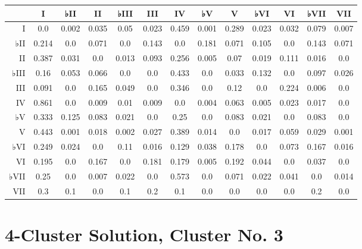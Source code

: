 \begin{table}[htbp]
\begin{minipage}{\linewidth}
\setlength{\tymax}{0.5\linewidth}
\centering
\small
\begin{tabulary}{\textwidth}{@{}RCCCCCCCCCCCC@{}} \toprule
&I&♭II&II&♭III&III&IV&♭V&V&♭VI&VI&♭VII&VII\\
\midrule
I&0.0&0.002&0.035&0.05&0.023&0.459&0.001&0.289&0.023&0.032&0.079&0.007\\
♭II&0.214&0.0&0.071&0.0&0.143&0.0&0.181&0.071&0.105&0.0&0.143&0.071\\
II&0.387&0.031&0.0&0.013&0.093&0.256&0.005&0.07&0.019&0.111&0.016&0.0\\
♭III&0.16&0.053&0.066&0.0&0.0&0.433&0.0&0.033&0.132&0.0&0.097&0.026\\
III&0.091&0.0&0.165&0.049&0.0&0.346&0.0&0.12&0.0&0.224&0.006&0.0\\
IV&0.861&0.0&0.009&0.01&0.009&0.0&0.004&0.063&0.005&0.023&0.017&0.0\\
♭V&0.333&0.125&0.083&0.021&0.0&0.25&0.0&0.083&0.021&0.0&0.083&0.0\\
V&0.443&0.001&0.018&0.002&0.027&0.389&0.014&0.0&0.017&0.059&0.029&0.001\\
♭VI&0.249&0.024&0.0&0.11&0.016&0.129&0.038&0.178&0.0&0.073&0.167&0.016\\
VI&0.195&0.0&0.167&0.0&0.181&0.179&0.005&0.192&0.044&0.0&0.037&0.0\\
♭VII&0.25&0.0&0.007&0.022&0.0&0.573&0.0&0.071&0.022&0.041&0.0&0.014\\
VII&0.3&0.1&0.0&0.1&0.2&0.1&0.0&0.0&0.0&0.0&0.2&0.0\\

\bottomrule

\end{tabulary}
\end{minipage}
\end{table}

\section{4-Cluster Solution, Cluster No. 3}
\label{4-clustersolutionclusterno.3}

